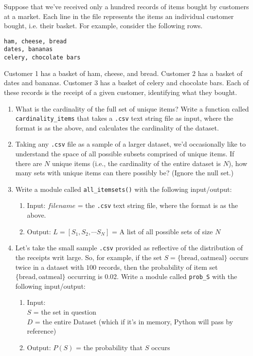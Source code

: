 \documentclass[paper=a4, fontsize=11pt]{scrartcl} %
\begin{document}
Suppose that we've received only a hundred records of items bought by customers at a market. Each line in the file represents the items an individual customer bought, i.e. their basket. For example, consider the following rows.

\begin{lstlisting}
ham, cheese, bread
dates, bananas
celery, chocolate bars
\end{lstlisting}

Customer 1 has a basket of ham, cheese, and bread. Customer 2 has a basket of dates and bananas. Customer 3 has a basket of celery and chocolate bars. Each of these records is the receipt of a given customer, identifying what they bought.

\begin{enumerate}
    \item What is the cardinality of the full set of unique items? Write a function called \verb"cardinality_items" that takes a \verb".csv" text string file as input, where the format is as the above, and calculates the cardinality of the dataset.
    \item Taking any \verb".csv" file as a sample of a larger dataset, we'd occasionally like to understand the space of all possible subsets comprised of unique items. If there are $N$ unique items (i.e., the cardinality of the entire dataset is $N$), how many sets with unique items can there possibly be? (Ignore the null set.)
    \item Write a module called \verb"all_itemsets()" with the following input/output:
      \begin{enumerate}
      \item Input: $filename$ = the \verb".csv" text string file, where the format is as the above.
      \item Output: $L = [ S_1, S_2, \cdots S_N ]$ = A list of all possible sets of size $N$
      \end{enumerate}
    \item Let's take the small sample \verb".csv" provided as reflective of the distribution of the receipts writ large. So, for example, if the set $S= \{ \text{bread}, \text{oatmeal}\}$ occurs twice in a dataset with $100$ records, then the probability of item set $\{ \text{bread}, \text{oatmeal} \}$ occurring is 0.02. Write a module called \verb"prob_S" with the following input/output:
      \begin{enumerate}
      \item Input: \\ $S$ = the set in question \\ $D$ = the entire Dataset (which if it's in memory, Python will pass by reference)
      \item Output: $P(S)$ = the probability that $S$ occurs
      \end{enumerate}
\end{enumerate}
\end{document}
